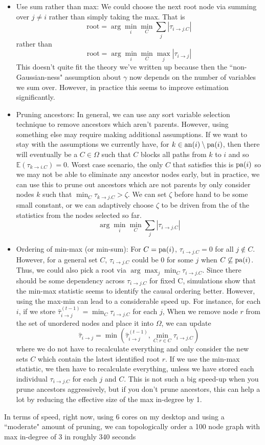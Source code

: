 \documentclass[]{article}
\newcommand{\an}{{\rm an}}       %
\newcommand{\pa}{{\rm pa}}       %
\begin{document}
\begin{itemize}
\item Use sum rather than max: We could choose the next root node via summing over $j \neq i$ rather than simply taking the max. That is 
\[\text{root} = \arg\min_i \min_C \sum_j  |\tau_{i\rightarrow j.C}|\] rather than 
\[\text{root} = \arg \min_i \min_C \max_j |\tau_{i\rightarrow j}|\] 
This doesn't quite fit the theory we've written up because then the ``non-Gaussian-ness" assumption about $\gamma$ now depends on the number of variables we sum over. However, in practice this seems to improve estimation significantly. 
\item Pruning ancestors: In general, we can use any sort variable selection technique to remove ancestors which aren't parents. However, using something else may require making additional assumptions. If we want to stay with the assumptions we currently have, for $k \in \an(i) \setminus \pa(i)$, then there will eventually be a $C \in \Omega$ such that $C$ blocks all paths from $k$ to $i$ and so $\mathbb{E}(\tau_{k \rightarrow i.C}) = 0$. Worst case scenario, the only $C$ that satisfies this is $\pa(i)$ so we may not be able to eliminate any ancestor nodes early, but in practice, we can use this to prune out ancestors which are not parents by only consider nodes $k$ such that $\min_C \tau_{k \rightarrow j.C} > \zeta$. We can set $\zeta$ before hand to be some small constant, or we can adaptively choose $\zeta$ to be driven from the of the statistics from the nodes selected so far. 
\[\arg\min_i \min_C \sum_j  |\tau_{i\rightarrow j.C}|\]
\item Ordering of min-max (or min-sum): For $C = \pa(i)$, $ \tau_{i\rightarrow j.C} = 0$ for all $j \not\in C$. However, for a general set $C$, $\tau_{i \rightarrow j.C}$ could be 0 for some $j$ when $C \not \subseteq \pa(i)$. Thus, we could also pick a root via $\arg \max_j \min_C \tau_{i\rightarrow j.C}$. Since there should be some dependency across $\tau_{i\rightarrow j.C}$ for fixed C, simulations show that the min-max statistic seems to identify the causal ordering better. However, using the max-min can lead to a considerable speed up. For instance, for each $i$, if we store $\hat \tau_{i \rightarrow j}^{(t-1)} = \min_C \tau_{i \rightarrow j.C}$ for each $j$, When we remove node $r$ from the set of unordered nodes and place it into $\Omega$, we can update 
\[\hat \tau_{i \rightarrow j} = \min\left(\hat \tau_{i \rightarrow j}^{(t-1)}, \min_{C: r \in C} \tau_{i \rightarrow j.C}\right)\] where we do not have to recalculate everything and only consider the new sets $C$ which contain the latest identified root $r$. If we use the min-max statistic, we then have to recalculate everything, unless we have stored each individual $\tau_{i\rightarrow j.C}$ for each $j$ and $C$. This is not such a big speed-up when you prune ancestors aggressively, but if you don't prune ancestors, this can help a lot by reducing the effective size of the max in-degree by 1. 
\end{itemize}

In terms of speed, right now, using 6 cores on my desktop and using a ``moderate" amount of pruning, we can topologically order a 100 node graph with max in-degree of 3 in roughly 340 seconds 
\end{document}
